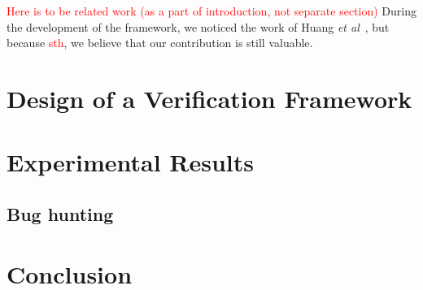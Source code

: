\documentclass[draft]{llncs}
\newcommand{\notice}[1]{\textcolor{red}{#1}}
\begin{document}
\notice{Here is to be related work (as a part of introduction, not separate section)}
During the development of the framework, we noticed the work of Huang
\textit{et al}~\cite{huang-soc-hw-verification}, but because \notice{sth}, we
believe that our contribution is still valuable.



\vspace*{-0mm}\section{Design of a Verification Framework}\vspace*{-0mm}


\vspace*{-0mm}\section{Experimental Results}\vspace*{-0mm}


\vspace*{-0mm}\subsection{Bug hunting}\vspace*{-0mm}


\vspace*{-0mm}\section{Conclusion}\vspace*{-0mm} \label{sec:conclusion}
\end{document}
